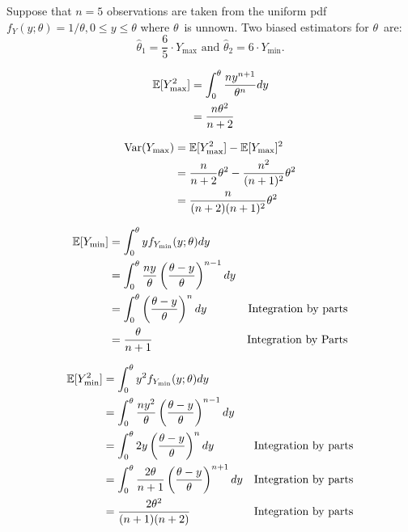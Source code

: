 \begin{problem}
   Suppose that ${n = 5}$ observations are taken from the uniform pdf ${f_{Y}(y;\theta) = 1/\theta, 0 \leq y \leq \theta}$ where $\theta$~is unnown.  Two biased estimators for $\theta$~are:
  \begin{equation*}
    \hat{\theta}_1 = \frac{6}{5} \cdot Y_{\max} \text{ and } \hat{\theta}_2 = 6\cdot Y_{\min}\text{.}
  \end{equation*}
\end{problem}

\begin{align*}
  \mathbb{E}\lbrack Y_{\max}^2\rbrack &= \int_{0}^{\theta} \frac{n y^{n+1}}{\theta^{n}} dy \\
                                &= \frac{n\theta^2}{n+2}
\end{align*}

\begin{align*}
  \text{Var}(Y_{\max}) &= \mathbb{E}\lbrack Y_{\max}^2\rbrack - \mathbb{E}\lbrack Y_{\max}\rbrack^{2} \\
                       &= \frac{n}{n+2}\theta^2 - \frac{n^2}{(n+1)^{2}}\theta^2 \\
                       &= \frac{n}{(n+2)(n+1)^{2}}\theta^{2}
\end{align*}

\begin{align*}
  \mathbb{E}\lbrack Y_{\min}\rbrack &= \int_{0}^{\theta} y f_{Y_{\min}}(y;\theta)dy \\
                    &= \int_{0}^{\theta} \frac{ny}{\theta}\left(\frac{\theta -y}{\theta}\right)^{n-1} dy \\
                    &= \int_{0}^{\theta} \left(\frac{\theta -y}{\theta}\right)^{n} dy & \text{Integration by parts} \\
                    &= \frac{\theta}{n+1} & \text{Integration by Parts}
\end{align*}

\begin{align*}
  \mathbb{E}\lbrack Y_{\min}^{2}\rbrack &= \int_{0}^{\theta} y^2 f_{Y_{\min}}(y;\theta)dy \\
                    &= \int_{0}^{\theta} \frac{ny^2}{\theta}\left(\frac{\theta -y}{\theta}\right)^{n-1} dy \\
                    &= \int_{0}^{\theta} 2y\left(\frac{\theta -y}{\theta}\right)^{n} dy & \text{Integration by parts} \\
                    &= \int_{0}^{\theta} \frac{2\theta}{n+1} \left(\frac{\theta -y}{\theta}\right)^{n+1} dy & \text{Integration by parts} \\
                    &= \frac{2\theta^2}{(n+1)(n+2)} & \text{Integration by parts}
\end{align*}

